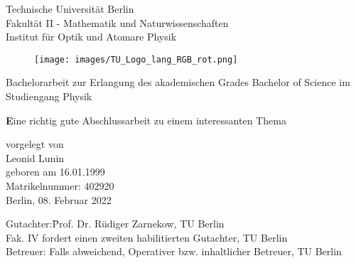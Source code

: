 \begin{titlepage}	
\noindent
\begin{minipage}{0.75\textwidth}
{\small
Technische Universit\"at Berlin\\
Fakult\"at II - Mathematik und Naturwissenschaften\\
Institut für Optik und Atomare Physik\\
}%
\end{minipage}%
\begin{minipage}{0.25\textwidth}%
\begin{figure}[H]%
{\raggedleft\texttt{[image: images/TU\_Logo\_lang\_RGB\_rot.png]}}
\end{figure}%
\hfill
\end{minipage}%

\vspace{2cm}

\thispagestyle{empty}
\begin{center}

{\large Bachelorarbeit zur Erlangung des akademischen Grades
Bachelor of Science
im Studiengang Physik}\\
\vspace{1cm}
{\huge\textbf
Eine richtig gute Abschlussarbeit zu einem interessanten Thema
 
}
\vspace{1.2cm}

{\large vorgelegt von\\
	 Leonid Lunin \\
	 geboren am 16.01.1999\\
	 Matrikelnummer: 402920\\[2cm]
	 Berlin, 08. Februar 2022\\[2cm]
}

\begin{minipage}{\linewidth} 
\begin{tabbing}
  		Gutachter:\quad \= Prof. Dr. Rüdiger Zarnekow, TU Berlin\\
                    \> Fak. IV fordert einen zweiten habilitierten Gutachter, TU Berlin \\[0.3cm]
    	Betreuer:             \> Falls abweichend, Operativer bzw. inhaltlicher Betreuer, TU Berlin \\
    						         
\end{tabbing}
\end{minipage}

\vspace{1.5cm}

\end{center}
\thispagestyle{empty}
\newpage
\setcounter{page}{1}
\end{titlepage}

\shipout\null
